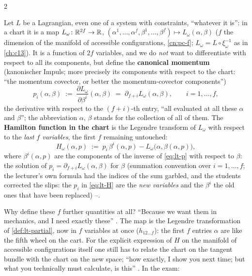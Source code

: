 \begin{paracol}{2}
\begin{definition}\label{def:lt-hamchart}
Let $L$ be a Lagrangian, even one of a system with constraints, ``whatever it is'': in a chart it is a map $L_\omega\colon\mathbb{R}^{2f}\to\mathbb{R}$, $(\alpha^1,\dots,\alpha^f,\beta^1,\dots,\beta^f)\mapsto L_\omega(\alpha,\beta)$ ($f$ the dimension of the manifold of accessible configurations, \cref{cn:pc-f}; $L_\omega=L\circ\xi_\omega^{-1}$ as in \cref{ch:c13}). It is a function of $2f$ variables, and we do \emph{not} want to differentiate with respect to all its components, but define the \textbf{canonical momentum} (kanonischer Impuls; more precisely its components with respect to the chart: ``the momentum covector, or better the momentum-covector components'')
\begin{equation}\label{eq:lt-p}
  p_i(\alpha,\beta)\;:=\;\frac{\partial L_\omega}{\partial\beta^i}(\alpha,\beta)\;=\;\partial_{f+i}L_\omega(\alpha,\beta),\qquad i=1,\dots,f,
\end{equation}
the derivative with respect to the $(f+i)$-th entry, ``all evaluated at all these $\alpha$ and $\beta$''; the abbreviation $\alpha$, $\beta$ stands for the collection of all of them. The \textbf{Hamilton function in the chart} is the Legendre transform of $L_\omega$ with respect to the \emph{last $f$ variables}, the first $f$ remaining untouched:
\begin{equation}\label{eq:lt-H}
  H_\omega(\alpha,p)\;:=\;p_i\,\beta^i(\alpha,p)-L_\omega\bigl(\alpha,\beta(\alpha,p)\bigr),
\end{equation}
where $\beta^i(\alpha,p)$ are the components of the inverse of \eqref{eq:lt-p} with respect to $\beta$: the solution of $p_i=\partial_{f+i}L_\omega(\alpha,\beta)$ for $\beta$ (summation convention over $i=1,\dots,f$; the lecturer's own formula had the indices of the sum garbled, and the students corrected the slips: the $p_i$ in \eqref{eq:lt-H} are the \emph{new variables} and the $\beta^i$ the old ones that have been replaced) --.
\end{definition}
Why define these $f$ further quantities at all? ``Because we want them in mechanics, and I need exactly these'' . The map is the Legendre transformation of \cref{def:lt-partial}, now in $f$ variables at once ($h_{12\dots f}$): the first $f$ entries $\alpha$ are like the fifth wheel on the cart. For the explicit expression of $H$ on the manifold of accessible configurations itself one still has to relate the chart on the tangent bundle with the chart on the new space; ``how exactly, I show you next time; but what you technically must calculate, is this'' . In the exam:


\end{paracol}
